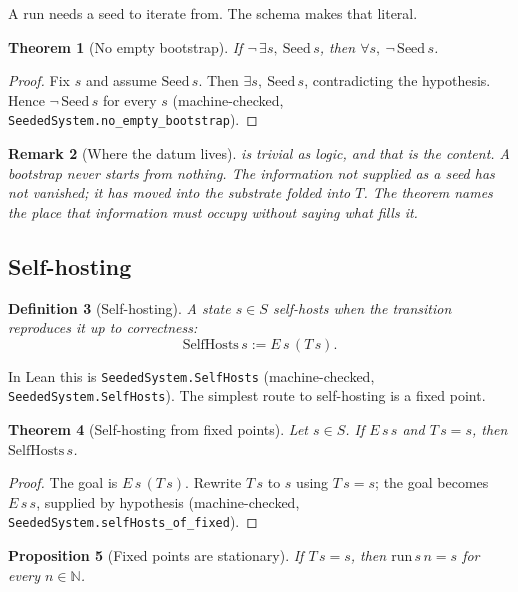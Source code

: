 \documentclass[11pt,a4paper]{article}
\newtheorem{theorem}{Theorem}[section]
\newtheorem{proposition}[theorem]{Proposition}
\newtheorem{definition}[theorem]{Definition}
\newtheorem{remark}[theorem]{Remark}
\newcommand{\Nat}{\mathbb{N}}
\newcommand{\Seed}{\mathrm{Seed}}
\newcommand{\SelfHosts}{\mathrm{SelfHosts}}
\newcommand{\run}{\mathrm{run}}
\begin{document}
A run needs a seed to iterate from.
The schema makes that literal.

\begin{theorem}[No empty bootstrap]
\label{thm:no-empty}
If $\neg\,\exists s,\ \Seed\,s$, then $\forall s,\ \neg\,\Seed\,s$.
\end{theorem}

\begin{proof}
Fix $s$ and assume $\Seed\,s$.
Then $\exists s,\ \Seed\,s$, contradicting the hypothesis.
Hence $\neg\,\Seed\,s$ for every $s$
(machine-checked, \texttt{SeededSystem.no\_empty\_bootstrap}).
\end{proof}

\begin{remark}[Where the datum lives]
\label{rem:no-empty}
 is trivial as logic, and that is the content.
A bootstrap never starts from nothing.
The information not supplied as a seed has not vanished; it has moved into the
substrate folded into $T$.
The theorem names the place that information must occupy without saying what
fills it.
\end{remark}

\subsection{Self-hosting}

\begin{definition}[Self-hosting]
\label{def:selfhost}
A state $s \in S$ \emph{self-hosts} when the transition reproduces it up to
correctness:
\[
  \SelfHosts\,s := E\,s\,(T\,s).
\]
\end{definition}

In Lean this is \texttt{SeededSystem.SelfHosts}
(machine-checked, \texttt{SeededSystem.SelfHosts}).
The simplest route to self-hosting is a fixed point.

\begin{theorem}[Self-hosting from fixed points]
\label{thm:selfhost-fixed}
Let $s \in S$.
If $E\,s\,s$ and $T\,s = s$, then $\SelfHosts\,s$.
\end{theorem}

\begin{proof}
The goal is $E\,s\,(T\,s)$.
Rewrite $T\,s$ to $s$ using $T\,s = s$; the goal becomes $E\,s\,s$, supplied by
hypothesis
(machine-checked, \texttt{SeededSystem.selfHosts\_of\_fixed}).
\end{proof}

\begin{proposition}[Fixed points are stationary]
\label{prop:stationary}
If $T\,s = s$, then $\run\,s\,n = s$ for every $n \in \Nat$.
\end{proposition}
\end{document}
